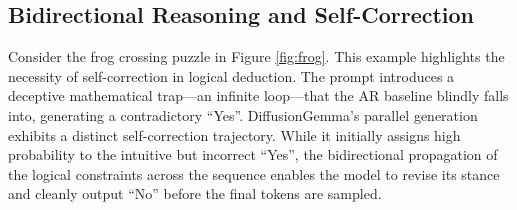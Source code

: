 \documentclass[11pt, a4paper, logo, copyright, gdm]{google}
\begin{document}
\subsection{Bidirectional Reasoning and Self-Correction}\label{app:advantages_bidir}

Consider the frog crossing puzzle in Figure \ref{fig:frog}. This example highlights the necessity of self-correction in logical deduction. The prompt introduces a deceptive mathematical trap---an infinite loop---that the AR baseline blindly falls into, generating a contradictory ``Yes''. DiffusionGemma's parallel generation exhibits a distinct self-correction trajectory. While it initially assigns high probability to the intuitive but incorrect ``Yes'', the bidirectional propagation of the logical constraints across the sequence enables the model to revise its stance and cleanly output ``No'' before the final tokens are sampled.
\end{document}
